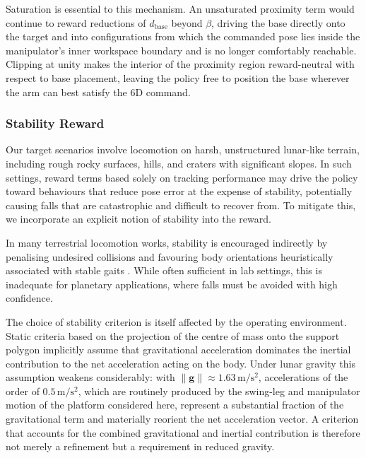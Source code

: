 Saturation is essential to this mechanism. An unsaturated proximity term would continue to reward reductions of $d_{\text{base}}$ beyond $\beta$, driving the base directly onto the target and into configurations from which the commanded pose lies inside the manipulator's inner workspace boundary and is no longer comfortably reachable. Clipping at unity makes the interior of the proximity region reward-neutral with respect to base placement, leaving the policy free to position the base wherever the arm can best satisfy the 6D command.

\subsubsection{Stability Reward}
\label{sec:stability}

Our target scenarios involve locomotion on harsh, unstructured lunar-like terrain, including rough rocky surfaces, hills, and craters with significant slopes. In such settings, reward terms based solely on tracking performance may drive the policy toward behaviours that reduce pose error at the expense of stability, potentially causing falls that are catastrophic and difficult to recover from. To mitigate this, we incorporate an explicit notion of stability into the reward.

In many terrestrial locomotion works, stability is encouraged indirectly by penalising undesired collisions and favouring body orientations heuristically associated with stable gaits \citep{chanesane2024solo, rudin2022learning}. While often sufficient in lab settings, this is inadequate for planetary applications, where falls must be avoided with high confidence.

The choice of stability criterion is itself affected by the operating environment. Static criteria based on the projection of the centre of mass onto the support polygon implicitly assume that gravitational acceleration dominates the inertial contribution to the net acceleration acting on the body. Under lunar gravity this assumption weakens considerably: with $\lVert\boldsymbol{g}\rVert\approx1.63\,\mathrm{m/s^2}$, accelerations of the order of $0.5\,\mathrm{m/s^2}$, which are routinely produced by the swing-leg and manipulator motion of the platform considered here, represent a substantial fraction of the gravitational term and materially reorient the net acceleration vector. A criterion that accounts for the combined gravitational and inertial contribution is therefore not merely a refinement but a requirement in reduced gravity.

